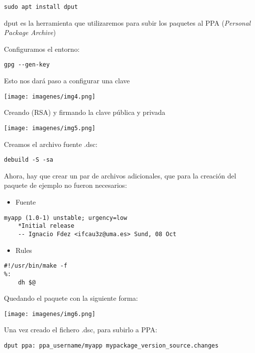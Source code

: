 \documentclass{article}
\begin{document}
  \lstset{language=C, breaklines=true, basicstyle=\footnotesize}
\begin{lstlisting}[frame=single]
sudo apt install dput
\end{lstlisting}
dput es la herramienta que utilizaremos para subir los paquetes al PPA (\textit{Personal Package Archive})

Configuramos el entorno:


  \lstset{language=C, breaklines=true, basicstyle=\footnotesize}
\begin{lstlisting}[frame=single]
gpg --gen-key
\end{lstlisting}
Esto nos dará paso a configurar una clave
\begin{center}
\texttt{[image: imagenes/img4.png]} 
\end{center}
Creando (RSA) y firmando la clave pública y privada
\begin{center}
\texttt{[image: imagenes/img5.png]} 
\end{center}

Creamos el archivo fuente .dsc:


\lstset{language=C, breaklines=true, basicstyle=\footnotesize}
\begin{lstlisting}[frame=single]
debuild -S -sa
\end{lstlisting}
\newpage
Ahora, hay que crear un par de archivos adicionales, que para la creación del paquete de ejemplo no fueron necesarios:
\begin{itemize}
\item Fuente
\end{itemize}

\lstset{language=C, breaklines=true, basicstyle=\footnotesize}
\begin{lstlisting}[frame=single]
myapp (1.0-1) unstable; urgency=low
	*Initial release
	-- Ignacio Fdez <ifcau3z@uma.es> Sund, 08 Oct
\end{lstlisting}


\begin{itemize}
\item Rules
\end{itemize}

\lstset{language=C, breaklines=true, basicstyle=\footnotesize}
\begin{lstlisting}[frame=single]
#!/usr/bin/make -f
%:
	dh $@
\end{lstlisting}


Quedando el paquete con la siguiente forma:
\begin{center}
\texttt{[image: imagenes/img6.png]} 
\end{center}


Una vez creado el fichero .dsc, para subirlo a PPA:

\lstset{language=C, breaklines=true, basicstyle=\footnotesize}
\begin{lstlisting}[frame=single]
dput ppa: ppa_username/myapp mypackage_version_source.changes
\end{lstlisting}
\end{document}
